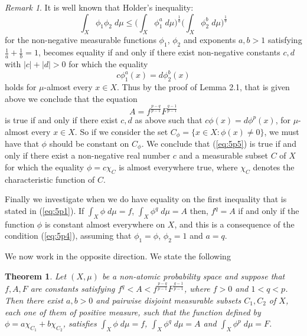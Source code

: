\documentclass{article}
\numberwithin{equation}{section}
\newtheorem{theorem}{Theorem}[section]
\theoremstyle{definition}
\theoremstyle{remark}
\newtheorem{remark}{Remark}[section]
\begin{document}
\begin{remark}
It is well known that Holder's inequality:
\begin{equation}\label{eq:5p3}
\int_X \phi_1 \phi_2 \; d\mu \leq \big(\int_X \phi_1^a \; d\mu \big)^{\frac{1}{a}} \big(\int_X \phi_2^b \; d\mu \big)^{\frac{1}{b}}
\end{equation}
for the non-negative measurable functions $\phi_1$, $\phi_2$ and exponents $a,b>1$ satisfying $\frac{1}{a}+\frac{1}{b}=1$, becomes equality if and only if there exist non-negative constants $c,d$ with $|c|+|d|>0$
for which the equality
\begin{equation}\label{eq:5p4}
c\phi_1^a(x)=d\phi_2^b(x)
\end{equation}
holds for $\mu$-almost every $x\in X$. Thus by the proof of Lemma 2.1, that is given above we conclude that the equation
\begin{equation}\label{eq:5p5}
A=f^{\frac{p-q}{p-1}}F^{\frac{q-1}{p-1}}
\end{equation}
is true if and only if there exist $c,d$ as above such that $c\phi(x)=d\phi^p(x)$, for $\mu$-almost every $x\in X$. So if we consider the set 
$C_{\phi}=\{x\in X: \phi(x)\neq 0\}$, we must have that $\phi$ should be constant on $C_{\phi}$. We conclude that (\ref{eq:5p5}) is true if and only if there exist a non-negative real number $c$ and a measurable subset $C$ of $X$ for which the equality $\phi=c\chi_C$ is almost everywhere true, where $\chi_C$ denotes the characteristic function of $C$.

Finally we investigate when we do have equality on the first  inequality that is stated in (\ref{eq:5p1}). If $\int_X \phi \; d\mu=f$,  $\int_X\phi^q \; d\mu=A$ then, $f^q=A$ if and only if the function $\phi$ is constant almost everywhere on $X$, and this is a consequence of the condition (\ref{eq:5p4}), assuming that $\phi_1=\phi$, $\phi_2=1$ and $a=q$.
\end{remark}

We now work in the opposite direction. We state the following
\begin{theorem}\label{thm:5p1}
Let $(X,\mu)$ be a non-atomic probability space and suppose that $f,A,F$ are constants satisfying $f^q<A<f^{\frac{p-q}{p-1}}F^{\frac{q-1}{p-1}}$, where $f>0$ and $1<q<p$. Then there exist $a, b>0$ and pairwise disjoint measurable subsets $C_1, C_2$ of $X$, each one of them of positive measure, such that the function defined by $\phi=a\chi_{C_1}+b\chi_{C_2}$, satisfies $\int_X \phi \; d\mu=f$, $\int_X \phi^q \; d\mu=A$ and $\int_X \phi^p \; d\mu=F$.
\end{theorem}
\end{document}
